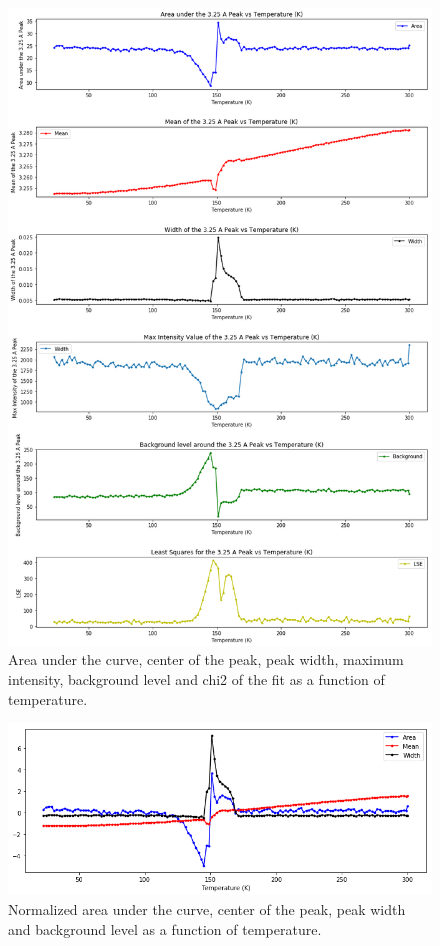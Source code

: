 	\begin{figure}[h]
	\centering
	\includegraphics[scale=0.25]{../figs/3p25.png}	
	\caption{Area under the curve, center of the peak, peak width, maximum intensity, background level and chi2 of the fit as a function of temperature.}
	\label{fig:peak3p25}
	\end{figure}

	\begin{figure}[h]
	\centering
	\includegraphics[scale=0.25]{../figs/norm.png}	
	\caption{Normalized area under the curve, center of the peak, peak width and background level as a function of temperature.}
	\label{fig:norm}
	\end{figure}
